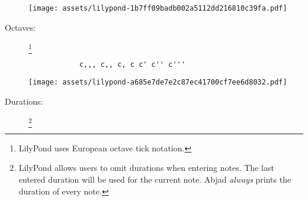 \documentclass[a4paper]{tufte-handout}
\newenvironment{abjadbookoutput}{}{}
\begin{document}
\begin{description}
\begin{multicols}{2}
            \begin{comment}
            <lilypond>[stylesheet=stylesheet-minimal.ily]
            { cs' bf as css' bff b b! b? }
            </lilypond>
            \end{comment}

            \begin{abjadbookoutput}
            \noindent\texttt{[image: assets/lilypond-1b7ff09badb002a5112dd216810c39fa.pdf]}
            \end{abjadbookoutput}

        \end{multicols}

    \item[Octaves:]\footnote{%
        LilyPond uses European octave tick notation.}
        \hfill \vspace{-\baselineskip} \\
        \begin{multicols}{2}

            \raggedcolumns

            \begin{verbatim}
            c,,, c,, c, c c' c'' c'''
            \end{verbatim}

            \vfill \null \columnbreak

            \begin{comment}
            <lilypond>[stylesheet=stylesheet-minimal.ily]
            {
                \clef "bass_15" c,,, c,,
                \clef "bass" c, c
                \clef "treble" c' c'' c'''
            }
            </lilypond>
            \end{comment}

            \begin{abjadbookoutput}
            \noindent\texttt{[image: assets/lilypond-a685e7de7e2c87ec41700cf7ee6d8032.pdf]}
            \end{abjadbookoutput}

        \end{multicols}

    \item[Durations:]\footnote{%
        LilyPond allows users to omit durations when entering notes. The last
        entered duration will be used for the current note. Abjad \emph{always}
        prints the duration of every note.}
        \hfill \vspace{-0.5\baselineskip} \\


\end{description}
\end{document}
